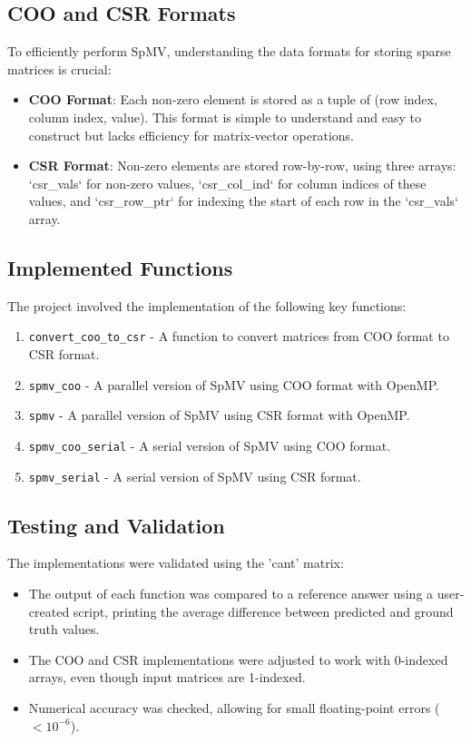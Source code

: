 \documentclass[12pt]{article}
\begin{document}
\subsection{COO and CSR Formats}
To efficiently perform SpMV, understanding the data formats for storing sparse matrices is crucial:
\begin{itemize}
    \item \textbf{COO Format}: Each non-zero element is stored as a tuple of (row index, column index, value). This format is simple to understand and easy to construct but lacks efficiency for matrix-vector operations.
    \item \textbf{CSR Format}: Non-zero elements are stored row-by-row, using three arrays: `csr\_vals` for non-zero values, `csr\_col\_ind` for column indices of these values, and `csr\_row\_ptr` for indexing the start of each row in the `csr\_vals` array.
\end{itemize}

\subsection{Implemented Functions}
The project involved the implementation of the following key functions:
\begin{enumerate}
    \item \texttt{convert\_coo\_to\_csr} - A function to convert matrices from COO format to CSR format.
    \item \texttt{spmv\_coo} - A parallel version of SpMV using COO format with OpenMP.
    \item \texttt{spmv} - A parallel version of SpMV using CSR format with OpenMP.
    \item \texttt{spmv\_coo\_serial} - A serial version of SpMV using COO format.
    \item \texttt{spmv\_serial} - A serial version of SpMV using CSR format.
\end{enumerate}

\subsection{Testing and Validation}
The implementations were validated using the 'cant' matrix:
\begin{itemize}
    \item The output of each function was compared to a reference answer using a user-created script, printing the average difference between predicted and ground truth values.
    \item The COO and CSR implementations were adjusted to work with 0-indexed arrays, even though input matrices are 1-indexed.
    \item Numerical accuracy was checked, allowing for small floating-point errors ($< 10^{-6}$).
\end{itemize}
\end{document}
